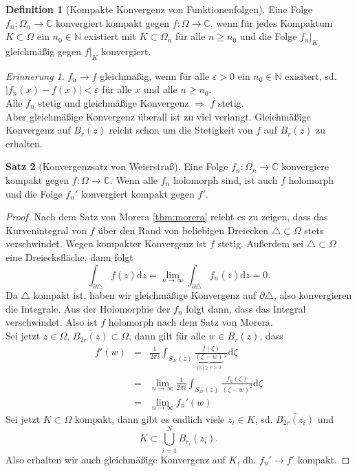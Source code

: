 \documentclass[11pt,titlepage]{article}
\theoremstyle{definition}
\newtheorem{theorem}{Satz}[section]
\newtheorem{definition}[theorem]{Definition}
\theoremstyle{remark}
\newtheorem*{remind}{Erinnerung}
\begin{document}
	\begin{definition}[Kompakte Konvergenz von Funktionenfolgen]
		Eine Folge $f_n:\Omega_n\to\mathbb{C}$ konvergiert kompakt gegen $f:\Omega\to\mathbb{C}$, wenn für 
		jedes Kompaktum $K\subset\Omega$ ein $n_0\in\mathbb{N}$ existiert mit $K\subset\Omega_n$ für alle 
		$n\geq n_0$ und die Folge $f_n|_K$ gleichmäßig gegen $f|_K$ konvergiert.
	\end{definition}
	
	\begin{remind}
		$f_n\to f$ gleichmäßig, wenn für alle $\varepsilon>0$ ein $n_0\in\mathbb{N}$ exisitert, sd. 
		$|f_n(x)-f(x)|<\varepsilon$ für alle $x$ und alle $n\geq n_0$. \\
		Alle $f_n$ stetig und gleichmäßige Konvergenz $\Rightarrow$ $f$ stetig. \\
		Aber gleichmäßige Konvergenz überall ist zu viel verlangt. Gleichmäßige Konvergenz auf $\overline{B_r(z)}$ 
		reicht schon um die Stetigkeit von $f$ auf $B_r(z)$ zu erhalten.
	\end{remind}
	
	\begin{theorem}[Konvergenzsatz von Weierstraß]
		Eine Folge $f_n:\Omega_n\to\mathbb{C}$ konvergiere kompakt gegen $f:\Omega\to\mathbb{C}$. Wenn alle 
		$f_n$ holomorph sind, ist auch $f$ holomorph und die Folge $f_n'$ konvergiert kompakt gegen $f'$.
	\end{theorem}
	
	\begin{proof}
		Nach dem Satz von Morera \ref{thm:morera} reicht es zu zeigen, dass das Kurvenintegral von $f$ über den 
		Rand von beliebigen Dreiecken $\triangle\subset\Omega$ stets verschwindet. Wegen kompakter 
		Konvergenz ist $f$ stetig. Außerdem sei $\triangle\subset\Omega$ eine Dreiecksfläche, dann folgt
		\[ \int_{\partial\triangle}f(z)\mathrm{d}z =\lim_{n\to\infty} \int_{\partial\triangle} f_n(z)\mathrm{d}z=0. \]
		Da $\triangle$ kompakt ist, haben wir gleichmäßige Konvergenz auf $\partial\triangle$, also konvergieren 
		die Integrale. Aus der Holomorphie der $f_n$ folgt dann, dass das Integral verschwindet. 
		Also ist $f$ holomorph nach dem Satz von Morera. \\
		Sei jetzt $z\in\Omega$, $\overline{B_{2r}(z)}\subset\Omega$, dann gilt für alle $w\in B_r(z)$, dass
		\begin{eqnarray*}
			f'(w)&=&\frac{1}{2\pi i} \int_{S_{2r}(z)} 
			\frac{f(\zeta)}{\underbrace{(\zeta -w)}_{|\%|\geq r>0}\ ^2}\mathrm{d}\zeta \\
			&=& \lim_{n\to\infty}\frac{1}{2\pi i} \int_{S_{2r}(z)}\frac{f_n(\zeta)}{(\zeta-w)^2}\mathrm{d}\zeta \\
			&=& \lim_{n\to\infty} f_n'(w)
		\end{eqnarray*}
		Sei jetzt $K\subset\Omega$ kompakt, dann gibt es endlich viele $z_i\in K$, sd. $\overline{B_{2r}(z_i)}$ und
		\[ K\subset \bigcup_{i=1}^N B_{r_i}(z_i) .\]
		Also erhalten wir auch gleichmäßige Konvergenz auf $K$, dh. $f_n'\to f'$ kompakt.
	\end{proof}
	
\end{document}
